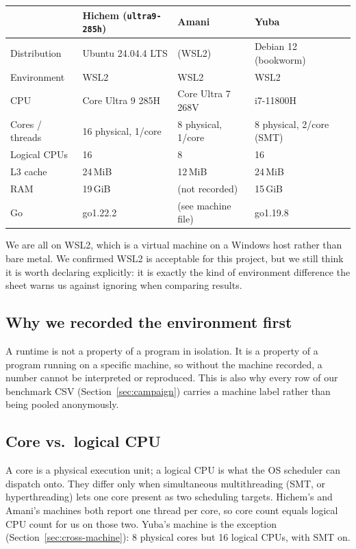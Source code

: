 \documentclass[11pt]{article}
\newcommand{\code}[1]{\texttt{#1}}
\begin{document}
\begin{center}
\begin{tabular}{llll}
\toprule
& Hichem (\code{ultra9-285h}) & Amani & Yuba \\
\midrule
Distribution & Ubuntu 24.04.4 LTS & (WSL2) & Debian 12 (bookworm) \\
Environment & WSL2 & WSL2 & WSL2 \\
CPU & Core Ultra 9 285H & Core Ultra 7 268V & i7-11800H \\
Cores / threads & 16 physical, 1/core & 8 physical, 1/core & 8 physical, 2/core (SMT) \\
Logical CPUs & 16 & 8 & 16 \\
L3 cache & 24\,MiB & 12\,MiB & 24\,MiB \\
RAM & 19\,GiB & (not recorded) & 15\,GiB \\
Go & go1.22.2 & (see machine file) & go1.19.8 \\
\bottomrule
\end{tabular}
\end{center}

We are all on WSL2, which is a virtual machine on a Windows host rather than bare metal. We
confirmed WSL2 is acceptable for this project, but we still think it is worth declaring
explicitly: it is exactly the kind of environment difference the sheet warns us against ignoring
when comparing results.

\subsection{Why we recorded the environment first}
A runtime is not a property of a program in isolation. It is a property of a program running on a
specific machine, so without the machine recorded, a number cannot be interpreted or reproduced.
This is also why every row of our benchmark CSV (Section~\ref{sec:campaign}) carries a machine
label rather than being pooled anonymously.

\subsection{Core vs.\ logical CPU}
A core is a physical execution unit; a logical CPU is what the OS scheduler can dispatch onto.
They differ only when simultaneous multithreading (SMT, or hyperthreading) lets one core present
as two scheduling targets. Hichem's and Amani's machines both report one thread per core, so core
count equals logical CPU count for us on those two. Yuba's machine is the exception
(Section~\ref{sec:cross-machine}): 8 physical cores but 16 logical CPUs, with SMT on.
\end{document}

